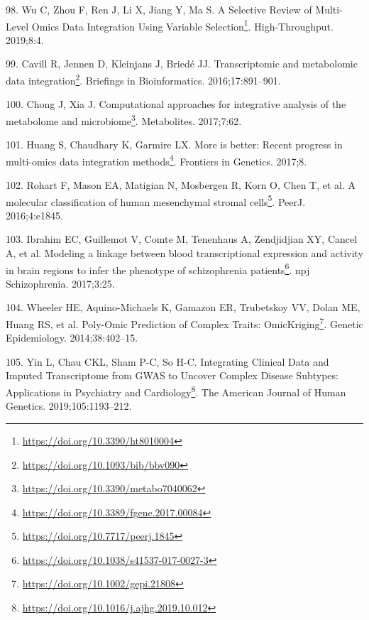 \documentclass[
  12pt,
  a4paper,
  twoside,
  openright]{book}
\DeclareRobustCommand{\href}[2]{#2\footnote{\url{#1}}}
\newlength{\cslhangindent}
\newlength{\cslentryspacingunit} %
\newenvironment{CSLReferences}[2] %
 {%
  \setlength{\parindent}{0pt}
  \ifodd #1
  \let\oldpar\par
  \def\par{\hangindent=\cslhangindent\oldpar}
  \fi
  \setlength{\parskip}{#2\cslentryspacingunit}
 }%
 {}
\begin{document}
\begin{CSLReferences}{0}{0}
\leavevmode{}%
98. Wu C, Zhou F, Ren J, Li X, Jiang Y, Ma S. \href{https://doi.org/10.3390/ht8010004}{A {Selective Review} of {Multi}-{Level Omics Data Integration Using Variable Selection}}. High-Throughput. 2019;8:4.

\leavevmode{}%
99. Cavill R, Jennen D, Kleinjans J, Briedé JJ. \href{https://doi.org/10.1093/bib/bbv090}{Transcriptomic and metabolomic data integration}. Briefings in Bioinformatics. 2016;17:891--901.

\leavevmode{}%
100. Chong J, Xia J. \href{https://doi.org/10.3390/metabo7040062}{Computational approaches for integrative analysis of the metabolome and microbiome}. Metabolites. 2017;7:62.

\leavevmode{}%
101. Huang S, Chaudhary K, Garmire LX. \href{https://doi.org/10.3389/fgene.2017.00084}{More is better: Recent progress in multi-omics data integration methods}. Frontiers in Genetics. 2017;8.

\leavevmode{}%
102. Rohart F, Mason EA, Matigian N, Mosbergen R, Korn O, Chen T, et al. \href{https://doi.org/10.7717/peerj.1845}{A molecular classification of human mesenchymal stromal cells}. PeerJ. 2016;4:e1845.

\leavevmode{}%
103. Ibrahim EC, Guillemot V, Comte M, Tenenhaus A, Zendjidjian XY, Cancel A, et al. \href{https://doi.org/10.1038/s41537-017-0027-3}{Modeling a linkage between blood transcriptional expression and activity in brain regions to infer the phenotype of schizophrenia patients}. npj Schizophrenia. 2017;3:25.

\leavevmode{}%
104. Wheeler HE, Aquino-Michaels K, Gamazon ER, Trubetskoy VV, Dolan ME, Huang RS, et al. \href{https://doi.org/10.1002/gepi.21808}{Poly-Omic Prediction of Complex Traits: OmicKriging}. Genetic Epidemiology. 2014;38:402--15.

\leavevmode{}%
105. Yin L, Chau CKL, Sham P-C, So H-C. \href{https://doi.org/10.1016/j.ajhg.2019.10.012}{Integrating Clinical Data and Imputed Transcriptome from GWAS to Uncover Complex Disease Subtypes: Applications in Psychiatry and Cardiology}. The American Journal of Human Genetics. 2019;105:1193--212.


\end{CSLReferences}
\end{document}
